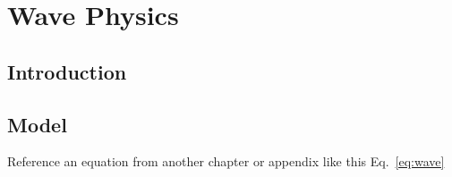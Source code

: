 %
\chapter{Wave Physics}

\section{Introduction}
\lipsum[3]

\section{Model}

Reference an equation from another chapter or appendix like this Eq.~\ref{eq:wave}
